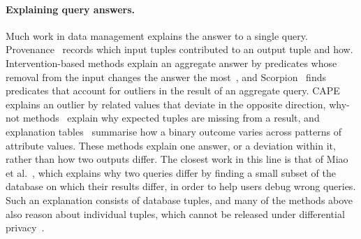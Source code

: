 \paragraph{Explaining query answers.}
Much work in data management explains the answer to a single query.
Provenance~\cite{buneman2001,cheney2009,herschel2017} records which input tuples contributed to an output tuple and how.
Intervention-based methods explain an aggregate answer by predicates whose removal from the input changes the answer the most~\cite{RoyS14}, and Scorpion~\cite{wu2013} finds predicates that account for outliers in the result of an aggregate query.
CAPE~\cite{MZGR19} explains an outlier by related values that deviate in the opposite direction, why-not methods~\cite{CJ09,tran2010conquer} explain why expected tuples are missing from a result, and explanation tables~\cite{ExplanationTables} summarise how a binary outcome varies across patterns of attribute values.
These methods explain one answer, or a deviation within it, rather than how two outputs differ.
The closest work in this line is that of Miao et al.~\cite{MiaoRY19}, which explains why two queries differ by finding a small subset of the database on which their results differ, in order to help users debug wrong queries.
Such an explanation consists of database tuples, and many of the methods above also reason about individual tuples, which cannot be released under differential privacy~\cite{TaoGMR22}.

